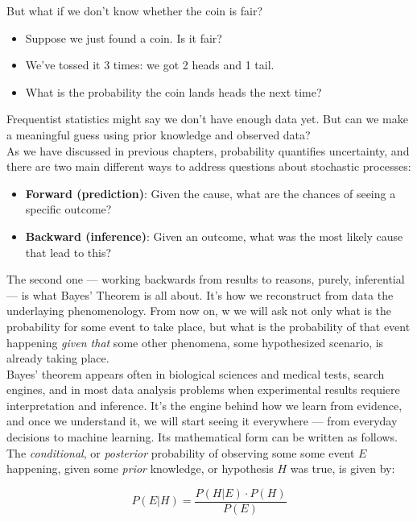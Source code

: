 \documentclass{book}
\begin{document}
But what if we don't know whether the coin is fair?

\begin{itemize}
    \item Suppose we just found a coin. Is it fair?
    \item We've tossed it 3 times: we got 2 heads and 1 tail.
    \item What is the probability the coin lands heads the next time?
\end{itemize}

Frequentist statistics might say we don't have enough data yet. But can we make a meaningful guess using prior knowledge and observed data?\\


As we have discussed in previous chapters, probability quantifies uncertainty, and there are two main different ways to address questions about stochastic processes:
\begin{itemize}
  \item \textbf{Forward (prediction)}: Given the cause, what are the chances of seeing a specific outcome?
  \item \textbf{Backward (inference)}: Given an outcome, what was the most likely cause that lead to this?
\end{itemize}

The second one — working backwards from results to reasons, purely, inferential — is what Bayes’ Theorem is all about. It’s how we reconstruct from data the underlaying phenomenology. From now on, w we will ask not only what is the probability for some event to take place, but what is the probability of that event happening \textit{given that} some other phenomena, some hypothesized scenario, is already taking place.\\

Bayes’ theorem appears often in biological sciences and medical tests, search engines, and in most data analysis problems when experimental results requiere interpretation and inference. It’s the engine behind how we learn from evidence, and once we understand it, we will start seeing it everywhere — from everyday decisions to machine learning. Its mathematical form can be written as follows. The \textit{conditional}, or \textit{posterior} probability of observing some some event $E$ happening, given some \textit{prior} knowledge, or hypothesis $H$ was true, is given by:

\begin{equation}
P(E|H) = \frac{P(H|E) \cdot P(H)}{P(E)}
\end{equation}
\end{document}
